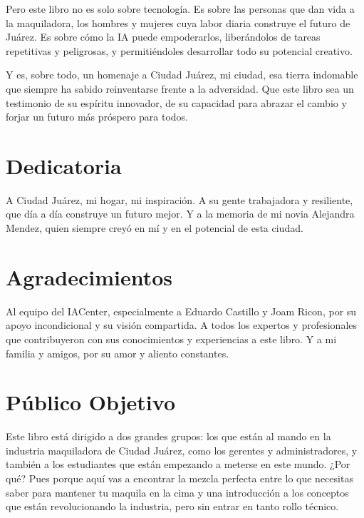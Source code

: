 \documentclass[
  10pt,
  letterpaper,
]{book}
\begin{document}
Pero este libro no es solo sobre tecnología. Es sobre las personas que
dan vida a la maquiladora, los hombres y mujeres cuya labor diaria
construye el futuro de Juárez. Es sobre cómo la IA puede empoderarlos,
liberándolos de tareas repetitivas y peligrosas, y permitiéndoles
desarrollar todo su potencial creativo.

Y es, sobre todo, un homenaje a Ciudad Juárez, mi ciudad, esa tierra
indomable que siempre ha sabido reinventarse frente a la adversidad. Que
este libro sea un testimonio de su espíritu innovador, de su capacidad
para abrazar el cambio y forjar un futuro más próspero para todos.

\section*{Dedicatoria}\label{dedicatoria}


A Ciudad Juárez, mi hogar, mi inspiración. A su gente trabajadora y
resiliente, que día a día construye un futuro mejor. Y a la memoria de
mi novia Alejandra Mendez, quien siempre creyó en mí y en el potencial
de esta ciudad.

\section*{Agradecimientos}\label{agradecimientos}


Al equipo del IACenter, especialmente a Eduardo Castillo y Joam Ricon,
por su apoyo incondicional y su visión compartida. A todos los expertos
y profesionales que contribuyeron con sus conocimientos y experiencias a
este libro. Y a mi familia y amigos, por su amor y aliento constantes.

\section*{Público Objetivo}\label{puxfablico-objetivo}


Este libro está dirigido a dos grandes grupos: los que están al mando en
la industria maquiladora de Ciudad Juárez, como los gerentes y
administradores, y también a los estudiantes que están empezando a
meterse en este mundo. ¿Por qué? Pues porque aquí vas a encontrar la
mezcla perfecta entre lo que necesitas saber para mantener tu maquila en
la cima y una introducción a los conceptos que están revolucionando la
industria, pero sin entrar en tanto rollo técnico.
\end{document}
